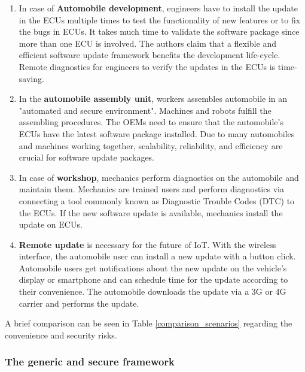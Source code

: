 \documentclass[12pt,a4paper]{article}
\begin{document}
\begin{enumerate}

\item In case of \textbf{Automobile development}, engineers have to install the update in the ECUs multiple times to test the functionality of new features or to fix the bugs in ECUs. It takes much time to validate the software package since more than one ECU is involved. The authors claim that a flexible and efficient software update framework benefits the development life-cycle. Remote diagnostics for engineers to verify the updates in the ECUs is time-saving. \cite{r3}

\item In the \textbf{automobile assembly unit}, workers assembles automobile in an "automated and secure environment". Machines and robots fulfill the assembling procedures. The OEMs need to ensure that the automobile's ECUs have the latest software package installed. Due to many automobiles and machines working together, scalability, reliability, and efficiency are crucial for software update packages. \cite{r3}

\item In case of \textbf{workshop}, mechanics perform diagnostics on the automobile and maintain them. Mechanics are trained users and perform diagnostics via connecting a tool commonly known as Diagnostic Trouble Codes (DTC) to the ECUs. If the new software update is available, mechanics install the update on ECUs.

\item \textbf{Remote update} is necessary for the future of IoT. With the wireless interface, the automobile user can install a new update with a button click. Automobile users get notifications about the new update on the vehicle's display or smartphone and can schedule time for the update according to their convenience. The automobile downloads the update via a 3G or 4G carrier and performs the update.

\end{enumerate}

A brief comparison can be seen in Table \ref{comparison_scenarios} regarding the convenience and security risks.


\subsubsection{The generic and secure framework}
\end{document}
